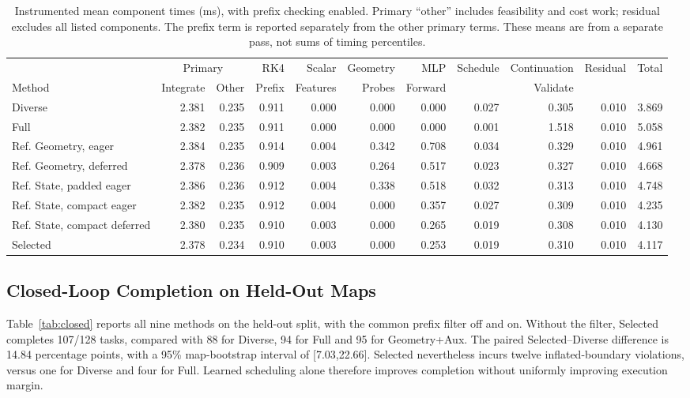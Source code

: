 \documentclass[journal]{IEEEtran}
\begin{document}
\begin{table}[!t]
\centering\scriptsize\setlength{\tabcolsep}{3pt}
\caption{Instrumented mean component times (ms), with prefix checking enabled. Primary ``other'' includes feasibility and cost work; residual excludes all listed components. The prefix term is reported separately from the other primary terms. These means are from a separate pass, not sums of timing percentiles.}
\label{tab:breakdown}
\begin{tabular}{lrrrrrrrrrr}
\toprule
 & \multicolumn{2}{c}{Primary} & RK4 & Scalar & Geometry & MLP & Schedule & Continuation & Residual & Total\\
Method & Integrate & Other & Prefix & Features & Probes & Forward & & Validate & & \\
\midrule
Diverse & 2.381 & 0.235 & 0.911 & 0.000 & 0.000 & 0.000 & 0.027 & 0.305 & 0.010 & 3.869 \\
Full & 2.382 & 0.235 & 0.911 & 0.000 & 0.000 & 0.000 & 0.001 & 1.518 & 0.010 & 5.058 \\
Ref. Geometry, eager & 2.384 & 0.235 & 0.914 & 0.004 & 0.342 & 0.708 & 0.034 & 0.329 & 0.010 & 4.961 \\
Ref. Geometry, deferred & 2.378 & 0.236 & 0.909 & 0.003 & 0.264 & 0.517 & 0.023 & 0.327 & 0.010 & 4.668 \\
Ref. State, padded eager & 2.386 & 0.236 & 0.912 & 0.004 & 0.338 & 0.518 & 0.032 & 0.313 & 0.010 & 4.748 \\
Ref. State, compact eager & 2.382 & 0.235 & 0.912 & 0.004 & 0.000 & 0.357 & 0.027 & 0.309 & 0.010 & 4.235 \\
Ref. State, compact deferred & 2.380 & 0.235 & 0.910 & 0.003 & 0.000 & 0.265 & 0.019 & 0.308 & 0.010 & 4.130 \\
Selected & 2.378 & 0.234 & 0.910 & 0.003 & 0.000 & 0.253 & 0.019 & 0.310 & 0.010 & 4.117 \\
\bottomrule
\end{tabular}
\end{table}

\subsection{Closed-Loop Completion on Held-Out Maps}
Table~\ref{tab:closed} reports all nine methods on the held-out split, with the common prefix filter off and on. Without the filter, Selected completes 107/128 tasks, compared with 88 for Diverse, 94 for Full and 95 for Geometry+Aux. The paired Selected--Diverse difference is 14.84 percentage points, with a 95\% map-bootstrap interval of [7.03,22.66]. Selected nevertheless incurs twelve inflated-boundary violations, versus one for Diverse and four for Full. Learned scheduling alone therefore improves completion without uniformly improving execution margin.
\end{document}
